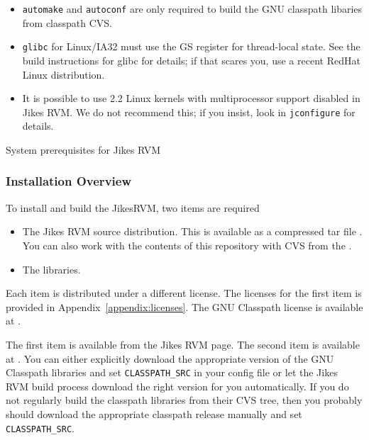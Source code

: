 \begin{table}[h]
\begin{center}
\begin{itemize}
\item {\tt automake} and {\tt autoconf} are only required to build the
GNU classpath libaries from classpath CVS. 
\item {\tt glibc} for Linux/IA32 must use the GS register for
thread-local state.  See the build instructions for glibc for details;
if that scares you, use a recent RedHat Linux distribution.
\item It is possible to use 2.2 Linux kernels with multiprocessor
support disabled in Jikes RVM.  We do not recommend this; if you
insist, look in {\tt jconfigure} for details.
\end{itemize}
\end{center}
\caption{System prerequisites for Jikes RVM}
\label{prereqs}
\end{table}

\AIXPPCJikesTMFooter

\JavaTMFooter

\subsubsection{Installation Overview}

To install and build the Jikes\trademark RVM, two items are required
\begin{itemize}
\item The Jikes RVM source distribution.  This is available as a
compressed tar file {\tt \RVMTarFile}.  You can also work with the
contents of this repository with CVS from the 
.

\item The 
 libraries. 
\end{itemize}

Each item is distributed under a different license.  The licenses for
the first item is provided in Appendix~\ref{appendix:licenses}.  The
GNU Classpath license is available at \xlink{{\tt
\classpathURL}}{\classpathURL}. 

The first item is available  from the Jikes RVM
 page. The second item is available at
\xlink{{\tt \classpathURL}}{\classpathURL}.
You can either explicitly download the appropriate version of the GNU
Classpath libraries and set {\tt CLASSPATH\_SRC} in your config file or let
the Jikes RVM build process download the right version for you
automatically. If you do not regularly build the classpath libraries
from their CVS tree, then you probably should download the appropriate
classpath release manually and set {\tt CLASSPATH\_SRC}. 

